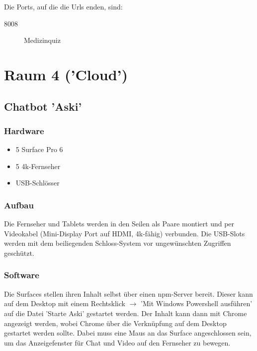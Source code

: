 \documentclass [titlepage,a4paper]{article}
\begin{document}
Die Ports, auf die die Urls enden, sind: \begin{description}
    \item[8008] Medizinquiz
\end{description}

\newpage
\section{Raum 4 ('Cloud')}

\subsection{Chatbot 'Aski'}

\subsubsection{Hardware}

\begin{itemize}
\item 5 Surface Pro 6
\item 5 4k-Fernseher
\item USB-Schlösser
\end{itemize}

\subsubsection{Aufbau}

Die Fernseher und Tablets werden in den Seilen als Paare montiert und per Videokabel (Mini-Display Port auf HDMI, 4k-fähig) verbunden. Die USB-Slots werden mit dem beiliegenden Schloss-System vor ungewünschten Zugriffen geschützt.

\subsubsection{Software}

Die Surfaces stellen ihren Inhalt selbst über einen npm-Server bereit. Dieser kann auf dem Desktop mit einem Rechtsklick $\rightarrow$ 'Mit Windows Powershell ausführen' auf die Datei 'Starte Aski' gestartet werden. Der Inhalt kann dann mit Chrome angezeigt werden, wobei Chrome über die Verknüpfung auf dem Desktop gestartet werden sollte. Dabei muss eine Maus an das Surface angeschlossen sein, um das Anzeigefenster für Chat und Video auf den Fernseher zu bewegen.
\end{document}
